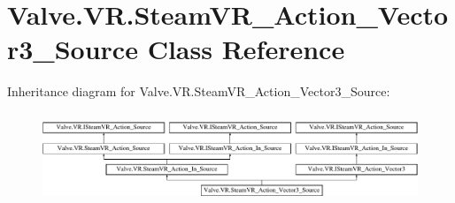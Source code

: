\hypertarget{class_valve_1_1_v_r_1_1_steam_v_r___action___vector3___source}{}\section{Valve.\+V\+R.\+Steam\+V\+R\+\_\+\+Action\+\_\+\+Vector3\+\_\+\+Source Class Reference}
\label{class_valve_1_1_v_r_1_1_steam_v_r___action___vector3___source}
Inheritance diagram for Valve.\+V\+R.\+Steam\+V\+R\+\_\+\+Action\+\_\+\+Vector3\+\_\+\+Source\+:\begin{figure}[H]
\begin{center}
\leavevmode
\includegraphics[height=2.745098cm]{class_valve_1_1_v_r_1_1_steam_v_r___action___vector3___source}
\end{center}
\end{figure}
